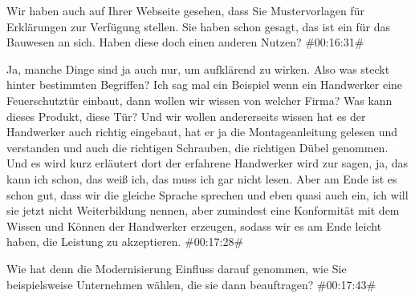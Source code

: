 \documentclass[a4paper, 12pt]{scrartcl}
\begin{document}
\begin{description}
\Fabian Wir haben auch auf Ihrer Webseite gesehen, dass Sie Mustervorlagen für Erklärungen zur Verfügung stellen. Sie haben schon gesagt, das ist ein für das Bauwesen an sich. Haben diese doch einen anderen Nutzen? \#00:16:31\#

\Andre Ja, manche Dinge sind ja auch nur, um aufklärend zu wirken. Also was steckt hinter bestimmten Begriffen? Ich sag mal ein Beispiel wenn ein Handwerker eine Feuerschutztür einbaut, dann wollen wir wissen von welcher Firma? Was kann dieses Produkt, diese Tür? Und wir wollen andererseits wissen hat es der Handwerker auch richtig eingebaut, hat er ja die Montageanleitung gelesen und verstanden und auch die richtigen Schrauben, die richtigen Dübel genommen. Und es wird kurz erläutert dort der erfahrene Handwerker wird zur sagen, ja, das kann ich schon, das weiß ich, das muss ich gar nicht lesen. Aber am Ende ist es schon gut, dass wir die gleiche Sprache sprechen und eben quasi auch ein, ich will sie jetzt nicht Weiterbildung nennen, aber zumindest eine Konformität mit dem Wissen und Können der Handwerker erzeugen, sodass wir es am Ende leicht haben, die Leistung zu akzeptieren. \#00:17:28\#

\Toni Wie hat denn die Modernisierung Einfluss darauf genommen, wie Sie beispielsweise Unternehmen wählen, die sie dann beauftragen? \#00:17:43\#


\end{description}
\end{document}
